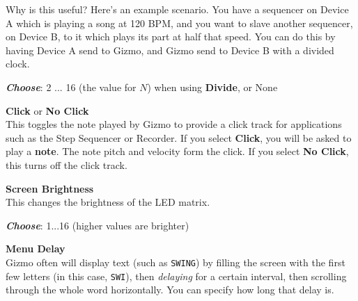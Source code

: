 \documentclass{article}
\begin{document}
\begin{description}
Why is this useful?  Here's an example scenario.  You have a sequencer on Device A which is playing a song at 120 BPM, and you want to slave another sequencer, on Device B, to it which plays its part at half that speed.  You can do this by having Device A send to Gizmo, and Gizmo send to Device B with a divided clock.

			\begin{description}
					\item{\bf \textit{Choose}}: 2 ... 16 (the value for \(N\)) when using {\bf Divide}, or None\hspace{1.45in}
			\end{description}

		
	\item{\bf Click} or {\bf No Click}\\
		This toggles the note played by Gizmo to provide a click track for applications such as the Step Sequencer or Recorder.  If you select {\bf Click}, you will be asked to play a {\bf note}.  The note pitch and velocity form the click.  If you select {\bf No Click}, this turns off the click track.
		
\hspace{\fill}\vspace{-1.5em}

	\item{\bf Screen Brightness}\\
		This changes the brightness of the LED matrix.
		\begin{description}
		\item{\bf \textit{Choose}}: 1...16 (higher values are brighter)
		\end{description}
		
		
	\item{\bf  Menu Delay}\\
		Gizmo often will display text (such as \texttt{SWING}) by filling the screen with the first few letters (in this case, \texttt{SWI}), then {\it delaying} for a certain interval, then scrolling through the whole word horizontally. You can specify how long that delay is.
	

\end{description}
\end{document}
